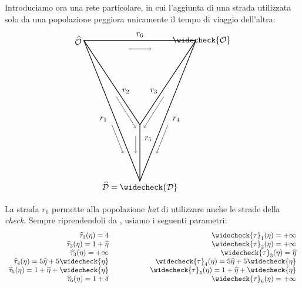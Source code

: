 Introduciamo ora una rete particolare, in cui l'aggiunta di una strada utilizzata solo da una popolazione peggiora unicamente il tempo di viaggio dell'altra:
\[
\quad
\begin{tikzpicture}[scale=1.2]

\coordinate (L) at (0,0);
\coordinate (R) at (4,0);
\coordinate (C) at (2,-3);
\coordinate (B) at (2,-5);


\draw[thick] (L) -- (R) -- (B) -- cycle;
\draw[thick] (L) -- (C);
\draw[thick] (R) -- (C);
\draw[thick] (C) -- (B);

\draw[->] (1.6,-0.3) -- (2.4,-0.3);

\draw[->] (1.15,-2) -- (1.85,-3.1);

\draw[->] (2.85,-2) -- (2.15,-3.1);

\draw[->] (1.85,-3.4) -- (1.85,-4);

\draw[->] (1, -3) -- (1.4, -4);

\draw[->] (3, -3) -- (2.6, -4);

\node at (0.7,-2.8) {$r_1$};
\node at (1.5,-1.8) {$r_2$};
\node at (2.5,-1.8) {$r_3$};
\node at (3.3,-2.8) {$r_4$};
\node at (2.3, -3.5) {$r_5$};
\node at (2, 0.2) {$r_6$};
\node at (-0.2, 0) {$\widehat{\mathcal{O}}$};
\node at (4.2, 0) {$\widecheck{\mathcal{O}}$};
\node at (2, -5.2) {$\widehat{\mathcal{D}} = \widecheck{\mathcal{D}}$};
\end{tikzpicture}
\quad
\]
La strada $r_6$ permette alla popolazione \textit{hat} di utilizzare anche le strade della \textit{check}.
Sempre riprendendoli da \cite[Cap. 3]{MR4911797}, usiamo i seguenti parametri:
\begin{equation*}
\begin{array}{r @{\hspace{2cm}} r}

\widehat{\tau}_1(\eta) = 4 &
\widecheck{\tau}_1(\eta) = +\infty \\

\widehat{\tau}_2(\eta) = 1+\widehat{\eta} &
\widecheck{\tau}_2(\eta) = +\infty \\

\widehat{\tau}_3(\eta) = +\infty &
\widecheck{\tau}_3(\eta) = \widehat{\eta} \\

\widehat{\tau}_4(\eta) = 5\widehat{\eta}+5\widecheck{\eta} &
\widecheck{\tau}_4(\eta) = 5\widehat{\eta}+5\widecheck{\eta} \\

\widehat{\tau}_5(\eta) = 1+\widehat{\eta}+\widecheck{\eta} &
\widecheck{\tau}_5(\eta) = 1+\widehat{\eta}+\widecheck{\eta} \\

\widehat{\tau}_6(\eta) = 1+\delta &
\widecheck{\tau}_6(\eta) = +\infty 
$$
\end{array}
\end{equation*}
